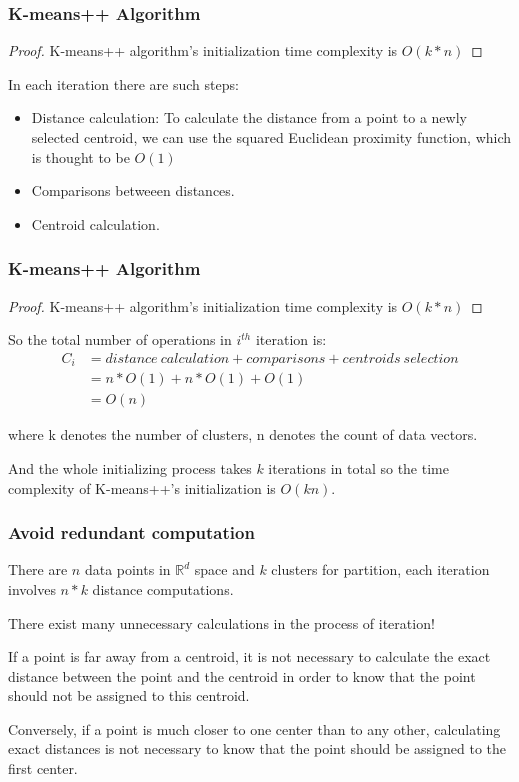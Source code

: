 \documentclass[9pt]{beamer}
\newcommand{\ccp}[1]{{\color{purple}#1}}
\begin{document}
\begin{frame}
	\frametitle{K-means++ Algorithm}
	\begin{proof}
		K-means++ algorithm's initialization time complexity is $O(k*n)$
	\end{proof}
		\par In each iteration there are such steps:
		\begin{itemize}
			\item Distance calculation: To calculate the distance from a point to a newly selected centroid, we can use the squared Euclidean proximity function, which is thought to be $O(1)$
			\item Comparisons betweeen distances.
			\item Centroid calculation.
		\end{itemize}
\end{frame}

\begin{frame}
	\frametitle{K-means++ Algorithm}
	\begin{proof}
		K-means++ algorithm's initialization time complexity is $O(k*n)$
	\end{proof}
		\par So the total number of operations in $i^{th}$ iteration is:
		\begin{equation*}
			\begin{split}
				C_i &=  distance\ calculation + comparisons + centroids\ selection\\
				& = n * O(1) + n * O(1) + O(1) \\
				& = O(n)
			\end{split}
		\end{equation*}
		\par where k denotes the number of clusters, n denotes the count of data vectors.
		\par And the whole initializing process takes $k$ iterations in total so the time complexity of K-means++'s initialization is $O(kn)$.

\end{frame}

\begin{frame}
	\frametitle{Avoid redundant computation}
	There are $n$ data points in $\mathbb{R}^ d$ space and $k$ clusters for partition, each iteration involves $n * k$ distance computations.\par
	There exist many unnecessary calculations in the process of iteration! \par
	\pause
	\par If a point is \ccp{far away from a centroid}, it is not necessary to calculate the exact distance between the point and the centroid in order to know that the point should not be assigned to this centroid.\par
	Conversely, \ccp{if a point is much closer to one center than to any other}, calculating exact distances is not necessary to know that the point should be assigned to the first center.


\end{frame}
\end{document}
